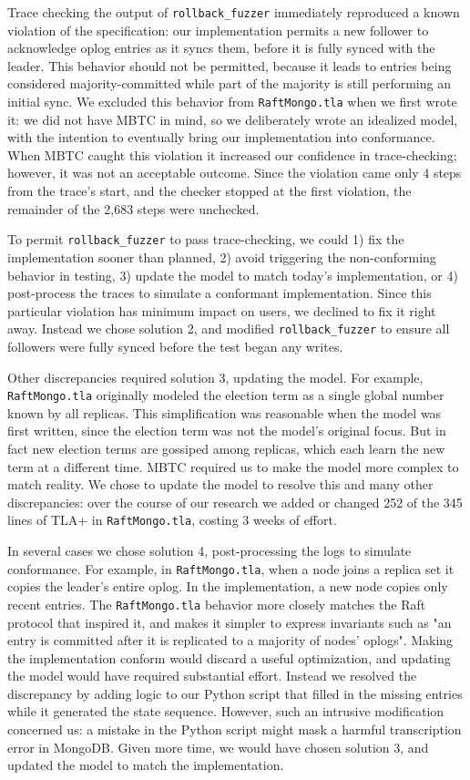 \documentclass{vldb}
\begin{document}
Trace checking the output of \texttt{rollback\_fuzzer} immediately reproduced a known violation \cite{SERVER-17934} of the specification: our implementation permits a new follower to acknowledge oplog entries as it syncs them, before it is fully synced with the leader.
This behavior should not be permitted, because it leads to entries being considered majority-committed while part of the majority is still performing an initial sync.
We excluded this behavior from \texttt{RaftMongo.tla} when we first wrote it:
we did not have MBTC in mind, so we deliberately wrote an idealized model, with the intention to eventually bring our implementation into conformance.
When MBTC caught this violation it increased our confidence in trace-checking; however, it was not an acceptable outcome. 
Since the violation came only 4 steps from the trace's start, and the checker stopped at the first violation, the remainder of the 2,683 steps were unchecked. 

To permit \texttt{rollback\_fuzzer} to pass trace-checking, we could 1) fix the implementation sooner than planned, 2) avoid triggering the non-conforming behavior in testing, 3) update the model to match today's implementation, or 4) post-process the traces to simulate a conformant implementation.
Since this particular violation has minimum impact on users, we declined to fix it right away.
Instead we chose solution 2, and modified \texttt{rollback\_fuzzer} to ensure all followers were fully synced before the test began any writes. 

Other discrepancies required solution 3, updating the model. 
For example, \texttt{RaftMongo.tla} originally modeled the election term as a single global number known by all replicas.
This simplification was reasonable when the model was first written, since the election term was not the model's original focus. 
But in fact new election terms are gossiped among replicas, which each learn the new term at a different time.
MBTC required us to make the model more complex to match reality. 
We chose to update the model to resolve this and many other discrepancies: over the course of our research we added or changed 252 of the 345 lines of TLA+ in \texttt{RaftMongo.tla}, costing 3 weeks of effort.

In several cases we chose solution 4, post-processing the logs to simulate conformance. For example, in \texttt{RaftMongo.tla}, when a node joins a replica set it copies the leader's entire oplog.
In the implementation, a new node copies only recent entries.
The \texttt{RaftMongo.tla} behavior more closely matches the Raft protocol that inspired it, and makes it simpler to express invariants such as "an entry is committed after it is replicated to a majority of nodes' oplogs".
Making the implementation conform would discard a useful optimization, and updating the model would have required substantial effort.
Instead we resolved the discrepancy by adding logic to our Python script that filled in the missing entries while it generated the state sequence.
However, such an intrusive modification concerned us: a mistake in the Python script might mask a harmful transcription error in MongoDB.
Given more time, we would have chosen solution 3, and updated the model to match the implementation.
\end{document}
